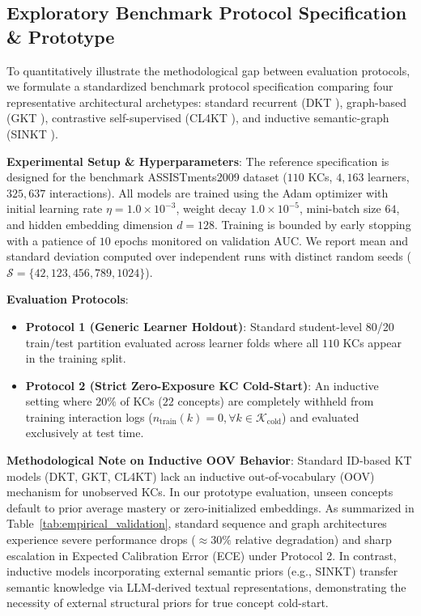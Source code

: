 \documentclass[10pt,journal,compsoc]{IEEEtran}
\begin{document}
\subsection{Exploratory Benchmark Protocol Specification \& Prototype}
To quantitatively illustrate the methodological gap between evaluation protocols, we formulate a standardized benchmark protocol specification comparing four representative architectural archetypes: standard recurrent (DKT \cite{Piech_DKT_2015}), graph-based (GKT \cite{KT004_GKT_2019}), contrastive self-supervised (CL4KT \cite{KT039_CL4KT_2022}), and inductive semantic-graph (SINKT \cite{KT044_SINKT_2024}).

\textbf{Experimental Setup \& Hyperparameters}: The reference specification is designed for the benchmark ASSISTments2009 dataset ($110$ KCs, $4,163$ learners, $325,637$ interactions). All models are trained using the Adam optimizer with initial learning rate $\eta = 1.0 \times 10^{-3}$, weight decay $1.0 \times 10^{-5}$, mini-batch size $64$, and hidden embedding dimension $d=128$. Training is bounded by early stopping with a patience of $10$ epochs monitored on validation AUC. We report mean and standard deviation computed over independent runs with distinct random seeds ($\mathcal{S} = \{42, 123, 456, 789, 1024\}$).

\textbf{Evaluation Protocols}:
\begin{itemize}
    \item \textbf{Protocol 1 (Generic Learner Holdout)}: Standard student-level 80/20 train/test partition evaluated across learner folds where all $110$ KCs appear in the training split.
    \item \textbf{Protocol 2 (Strict Zero-Exposure KC Cold-Start)}: An inductive setting where $20\%$ of KCs ($22$ concepts) are completely withheld from training interaction logs ($n_{\text{train}}(k) = 0, \forall k \in \mathcal{K}_{\text{cold}}$) and evaluated exclusively at test time.
\end{itemize}

\textbf{Methodological Note on Inductive OOV Behavior}: Standard ID-based KT models (DKT, GKT, CL4KT) lack an inductive out-of-vocabulary (OOV) mechanism for unobserved KCs. In our prototype evaluation, unseen concepts default to prior average mastery or zero-initialized embeddings. As summarized in Table~\ref{tab:empirical_validation}, standard sequence and graph architectures experience severe performance drops ($\approx 30\%$ relative degradation) and sharp escalation in Expected Calibration Error (ECE) under Protocol 2. In contrast, inductive models incorporating external semantic priors (e.g., SINKT) transfer semantic knowledge via LLM-derived textual representations, demonstrating the necessity of external structural priors for true concept cold-start.
\end{document}
